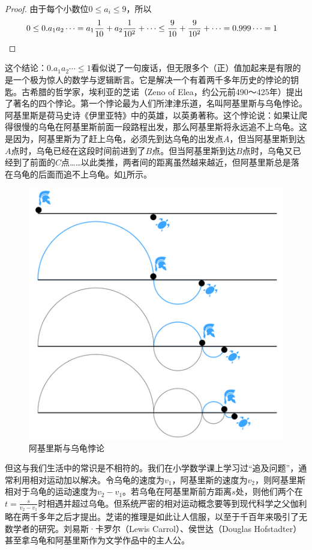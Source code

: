 \documentclass[b5paper]{ctexart}
\begin{document}
\begin{proof}
  由于每个小数位$0 \leq a_i \leq 9$，所以
  \begin{align*}
0 \leq 0.a_1 a_2 \cdots = a_1\frac{1}{10} + a_2\frac{1}{10^2} + \cdots \leq \frac{9}{10} + \frac{9}{10^2} + \cdots = 0.999\cdots = 1 & \qedhere
  \end{align*}
\end{proof}

这个结论：$0.a_1a_2\cdots \leq 1$看似说了一句废话，但无限多个（正）值加起来是有限的是一个极为惊人的数学与逻辑断言。它是解决一个有着两千多年历史的悖论的钥匙。古希腊的哲学家，埃利亚的芝诺（Zeno of Elea，约公元前490～425年）提出了著名的四个悖论。第一个悖论最为人们所津津乐道，名叫阿基里斯与乌龟悖论。阿基里斯是荷马史诗《伊里亚特》中的英雄，以英勇著称。这个悖论说：如果让爬得很慢的乌龟在阿基里斯前面一段路程出发，那么阿基里斯将永远追不上乌龟。这是因为，阿基里斯为了赶上乌龟，必须先到达乌龟的出发点$A$，但当阿基里斯到达$A$点时，乌龟已经在这段时间前进到了$B$点。但当阿基里斯到达$B$点时，乌龟又已经到了前面的$C$点……以此类推，两者间的距离虽然越来越近，但阿基里斯总是落在乌龟的后面而追不上乌龟。如\cref{fig:Achilles-paradox}所示。

\begin{figure}[htbp]
 \centering
 \includegraphics[scale=0.4]{img/achilles-paradox}
 \caption{阿基里斯与乌龟悖论}
 \label{fig:Achilles-paradox}
\end{figure}

但这与我们生活中的常识是不相符的。我们在小学数学课上学习过“追及问题”，通常利用相对运动加以解决。令乌龟的速度为$v_1$，阿基里斯的速度为$v_2$，则阿基里斯相对于乌龟的运动速度为$v_2 - v_1$。若乌龟在阿基里斯前方距离$s$处，则他们两个在$t = \frac{s}{v_2 - v_1}$时相遇并超过乌龟。但系统严密的相对运动概念要等到现代科学之父伽利略在两千多年之后才提出。芝诺的推理是如此让人信服，以至于千百年来吸引了无数学者的研究。刘易斯·卡罗尔（Lewis Carrol）、侯世达（Douglas Hofstadter）甚至拿乌龟和阿基里斯作为文学作品中的主人公。
\end{document}
